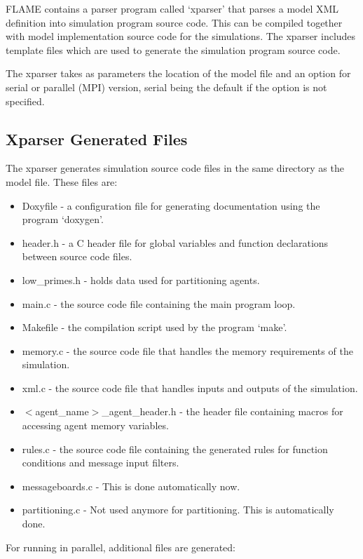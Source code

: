 \documentclass[a4paper,11pt]{article}
\begin{document}
FLAME contains a parser program called `xparser' that parses a model
XML definition into simulation program source code. This can be
compiled together with model implementation source code for the
simulations. The xparser includes template files which are used to
generate the simulation program source code.

The xparser takes as parameters the location of the model file and
an option for serial or parallel (MPI) version, serial being the
default if the option is not specified.

\subsection{Xparser Generated Files}

The xparser  generates simulation source code files in the same
directory as the model file. These files are:

\begin{itemize}
  \item Doxyfile - a configuration file for generating documentation using
 the program `doxygen'.
  \item header.h - a C header file for global variables and function
  declarations between source code files.
  \item low\_primes.h - holds data used for partitioning agents.
  \item main.c - the source code file containing the main program loop.
  \item Makefile - the compilation script used by the program `make'.
  \item memory.c - the source code file that handles the memory requirements
  of the simulation.
  \item xml.c - the source code file that handles inputs and outputs of the
  simulation.
  \item $<$agent\_name$>$\_agent\_header.h - the header file containing macros for
  accessing agent memory variables.
  \item rules.c - the source code file containing the generated rules for
  function conditions and message input filters.
  \item messageboards.c - This is done automatically now.
  \item partitioning.c - Not used anymore for partitioning. This is automatically done.
\end{itemize}

For running in parallel, additional files are generated:
\end{document}
